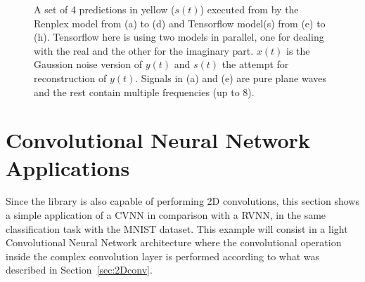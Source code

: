 \begin{figure}
	\begin{minipage}{\linewidth}
		\centering
	\end{minipage}
	\caption{A set of 4 predictions in yellow ($ s(t) $) executed from by the Renplex model from (a) to (d) and Tensorflow model(s) from (e) to (h). Tensorflow here is using two models in parallel, one for dealing with the real and the other for the imaginary part. $ x(t) $ is the Gaussion noise version of $ y(t) $ and $ s(t) $ the attempt for reconstruction of $ y(t) $. Signals in (a) and (e) are pure plane waves and the rest contain multiple frequencies (up to 8).}
	\label{fig:signals}
\end{figure}

\section{Convolutional Neural Network Applications}
Since the library is also capable of performing 2D convolutions, this section shows a simple application of a \gls{CVNN} in comparison with a \gls{RVNN}, in the same classification task with the MNIST dataset. This example will consist in a light Convolutional Neural Network architecture where the convolutional operation inside the complex convolution layer is performed according to what was described in Section~\ref{sec:2Dconv}.

